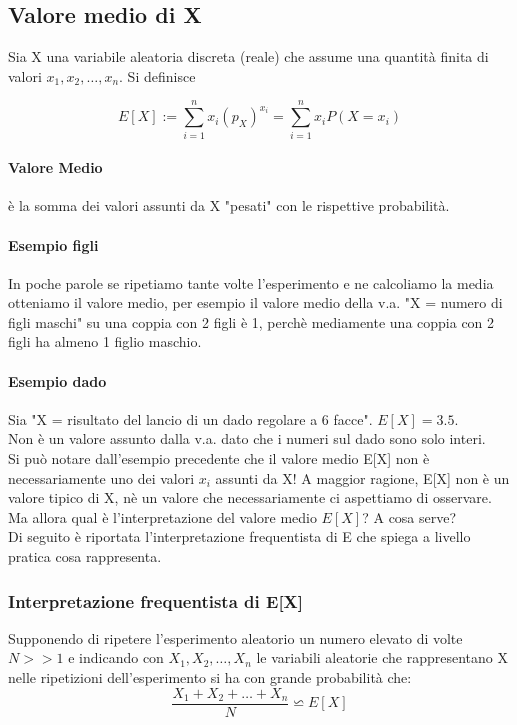 \documentclass[12pt, a4paper, openany]{book}
\begin{document}
\subsection{Valore medio di X}
Sia X una variabile aleatoria discreta (reale) che assume una quantità finita di valori
$x_1, x_2, \dots, x_n$. Si definisce

\begin{equation}
    E[X]:= \sum_{i = 1}^{n} x_i (p_X)^{x_i} = \sum_{i = 1}^{n} x_i P(X= x_i)
\end{equation}
\paragraph{Valore Medio} è la somma dei valori assunti da X "pesati" con le rispettive probabilità.

\paragraph*{Esempio figli}In poche parole se ripetiamo tante volte l'esperimento e ne calcoliamo la media otteniamo
il valore medio, per esempio il valore medio della v.a. "X = numero di figli maschi"
su una coppia con 2 figli è 1, perchè mediamente una coppia con 2 figli ha almeno 1 figlio maschio.

\paragraph*{Esempio dado} Sia "X = risultato del lancio di un dado regolare a 6 facce".
$E[X] = 3.5$. 
\\ Non è un valore assunto dalla v.a. dato che i numeri sul dado sono solo interi.
\\ Si può notare dall'esempio precedente che il valore medio E[X] non è necessariamente
uno dei valori $x_i$ assunti da X!
A maggior ragione, E[X] non è un valore tipico di X, nè un valore che necessariamente
ci aspettiamo di osservare.
\\ Ma allora qual è l'interpretazione del valore medio $E[X]$? A cosa serve?
\\ Di seguito è riportata l'interpretazione frequentista di E che spiega a livello
pratica cosa rappresenta.

\subsubsection{Interpretazione frequentista di E[X]}
Supponendo di ripetere l'esperimento aleatorio un numero elevato di volte $N >> 1$
e indicando con $X_1, X_2, \dots, X_n$ le variabili aleatorie che rappresentano X nelle
ripetizioni dell'esperimento si ha con grande probabilità che:
\begin{equation}
    \frac{X_1 + X_2 + \dots + X_n}{N} \backsimeq  E[X]
\end{equation}
\end{document}
